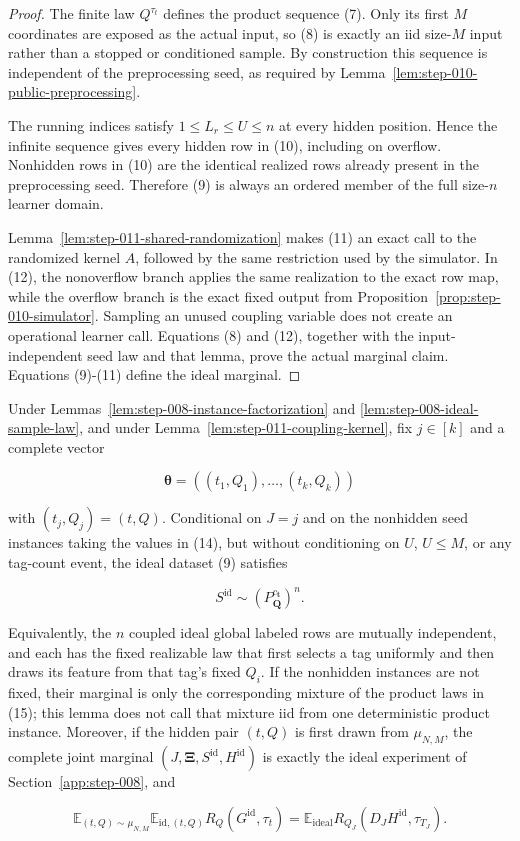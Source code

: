 \begin{proof}
The finite law \(Q^{\tau_t}\) defines the product sequence (7). Only its
first \(M\) coordinates are exposed as the actual input, so (8) is exactly
an iid size-\(M\) input rather than a stopped or conditioned sample. By
construction this sequence is independent of the preprocessing seed, as
required by Lemma~\ref{lem:step-010-public-preprocessing}.

The running indices satisfy \(1\le L_r\le U\le n\) at every hidden
position. Hence the infinite sequence gives every hidden row in (10),
including on overflow. Nonhidden rows in (10) are the identical realized
rows already present in the preprocessing seed. Therefore (9) is
always an ordered member of the full size-\(n\) learner domain.

Lemma~\ref{lem:step-011-shared-randomization} makes (11) an exact call to
the randomized kernel \(A\), followed by
the same restriction used by the simulator. In (12), the
nonoverflow branch applies the same realization to the exact row
map, while the overflow branch is the exact fixed output from Proposition~\ref{prop:step-010-simulator}. Sampling an unused coupling
variable does not create an operational learner call. Equations (8) and
(12), together with the input-independent seed law and that lemma, prove the
actual marginal claim. Equations (9)-(11) define the ideal marginal.
\end{proof}

\begin{lemma}\label{lem:step-011-ideal-marginal}
Under Lemmas~\ref{lem:step-008-instance-factorization} and
\ref{lem:step-008-ideal-sample-law}, and under
Lemma~\ref{lem:step-011-coupling-kernel}, fix \(j\in[k]\) and a complete
vector

\[
  \boldsymbol\theta=((t_1,Q_1),\ldots,(t_k,Q_k))
\tag{14}
\]

with \((t_j,Q_j)=(t,Q)\). Conditional on \(J=j\) and on the nonhidden
seed instances taking the values in (14), but without conditioning on
\(U\), \(U\le M\), or any tag-count event, the ideal dataset (9) satisfies

\[
  S^{\mathrm{id}}\sim
  \left(P_{\boldsymbol Q}^{c_{\boldsymbol t}}\right)^n.
\tag{15}
\]

Equivalently, the \(n\) coupled ideal global labeled rows are mutually independent,
and each has the fixed realizable law that first selects a tag uniformly
and then draws its feature from that tag's fixed \(Q_i\). If the nonhidden
instances are not fixed, their marginal is only the corresponding mixture
of the product laws in (15); this lemma does not call that mixture iid from
one deterministic product instance. Moreover, if the hidden pair
\((t,Q)\) is first drawn from \(\mu_{N,M}\), the complete joint marginal
\((J,\boldsymbol\Xi,S^{\mathrm{id}},H^{\mathrm{id}})\) is exactly the
ideal experiment of Section~\ref{app:step-008}, and

\[
  \mathbb E_{(t,Q)\sim\mu_{N,M}}
    \mathbb E_{\mathrm{id},(t,Q)}R_Q(G^{\mathrm{id}},\tau_t)
  =\mathbb E_{\mathrm{ideal}}
    R_{Q_J}(D_JH^{\mathrm{id}},\tau_{T_J}).
\tag{15a}
\]
\end{lemma}

